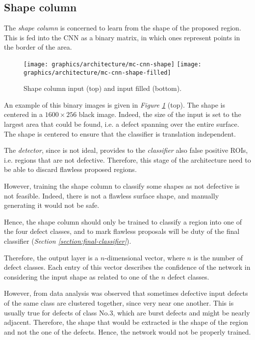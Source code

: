     \subsection{Shape column}\label{section:shape-column}
        \par{
            The \emph{shape column} is concerned to learn from the shape of the proposed region. This is fed into the CNN as a binary matrix, in which ones represent points in the border of the area.
        }
        \begin{figure}
            \centering
            \texttt{[image: graphics/architecture/mc-cnn-shape]}
            \vskip 0.05cm
            \texttt{[image: graphics/architecture/mc-cnn-shape-filled]}
            \caption{Shape column input (top) and input filled (bottom).}\label{fig:mc-cnn:shape-input}
        \end{figure}
        \par{
            An example of this binary images is given in \emph{Figure \ref{fig:mc-cnn:shape-input}} (top). The shape is centered in a $1600\times 256$ black image. Indeed, the size of the input is set to the largest area that could be found, i.e. a defect spanning over the entire surface. The shape is centered to ensure that the classifier is translation independent. 
        }
        \par{
            The \emph{detector}, since is not ideal, provides to the \emph{classifier} also false positive ROIs, i.e. regions that are not defective. Therefore, this stage of the architecture need to be able to discard flawless proposed regions.
        }
        \par{
            However, training the shape column to classify some shapes as not defective is not feasible. Indeed, there is not a flawless surface shape, and manually generating it would not be safe.
        }
        \par{
            Hence, the shape column should only be trained to classify a region into one of the four defect classes, and to mark flawless proposals will be duty of the final classifier (\emph{Section \ref{section:final-classifier}}).
        }
        \par{
            Therefore, the output layer is a $n$-dimensional vector, where $n$ is the number of defect classes. Each entry of this vector describes the confidence of the network in considering the input shape as related to one of the $n$ defect classes.
        }
        \par{
            However, from data analysis was observed that sometimes defective input defects of the same class are clustered together, since very near one another. This is usually true for defects of class No.3, which are burst defects and might be nearly adjacent. Therefore, the shape that would be extracted is the shape of the region and not the one of the defects. Hence, the network would not be properly trained.
        }
